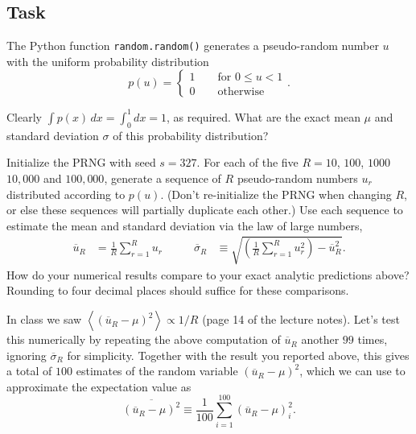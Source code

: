 \documentclass[12 pt]{article} %
\newcommand{\ubar}{\ensuremath{\overline u} }
\newcommand{\si}{\ensuremath{\sigma} }
\newcommand{\sibar}{\ensuremath{\overline\sigma} }
\newcommand{\vev}[1]{\ensuremath{\left\langle #1 \right\rangle} }
\newcommand{\showmarks}[1]{\rightline{\texttt{[#1 marks]}}} %
\begin{document}
\subsection*{Task}
The Python function \texttt{random.random()} generates a pseudo-random number $u$ with the uniform probability distribution
\begin{equation*}
  p(u) = \left\{\begin{array}{l}1 \qquad \mbox{for } 0 \leq u < 1 \\
                                0 \qquad \mbox{otherwise}\end{array}\right. .
\end{equation*}

Clearly $\int p(x) \, dx = \int_0^1 dx = 1$, as required.
What are the exact mean $\mu$ and standard deviation \si of this probability distribution?

\showmarks{2}

Initialize the PRNG with seed $s = 327$.
For each of the five $R = 10$, $100$, $1000$ $10{,}000$ and $100{,}000$, generate a sequence of $R$ pseudo-random numbers $u_r$ distributed according to $p(u)$.
(Don't re-initialize the PRNG when changing $R$, or else these sequences will partially duplicate each other.)
Use each sequence to estimate the mean and standard deviation via the law of large numbers,
\begin{align}
  \label{eq:mean}
  \ubar_R & = \frac{1}{R} \sum_{r = 1}^R u_r \qquad &
  \sibar_R & \equiv \sqrt{\left(\frac{1}{R} \sum_{r = 1}^R u_r^2\right) - \ubar_R^2}.
\end{align}
How do your numerical results compare to your exact analytic predictions above?
Rounding to four decimal places should suffice for these comparisons.

\showmarks{5}

\newpage %
In class we saw $\displaystyle \vev{\left(\ubar_R - \mu\right)^2} \propto 1 / R$ (page 14 of the lecture notes).
Let's test this numerically by repeating the above computation of $\ubar_R$ another $99$ times, ignoring $\sibar_R$ for simplicity.
Together with the result you reported above, this gives a total of $100$ estimates of the random variable $\left(\ubar_R - \mu\right)^2$, which we can use to approximate the expectation value as
\begin{equation}
  \overline{\left(\ubar_R - \mu\right)^2} \equiv \frac{1}{100} \sum_{i = 1}^{100} \left(\ubar_R - \mu\right)_i^2.
\end{equation}
\end{document}

